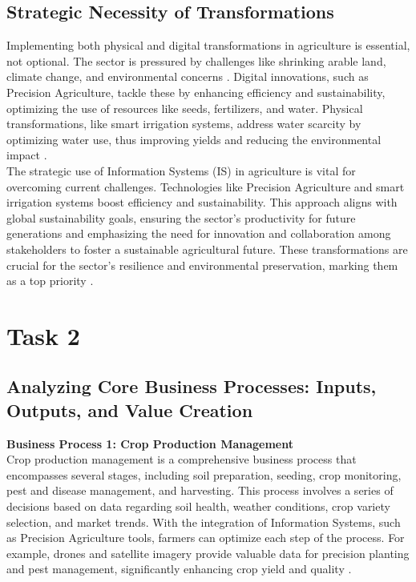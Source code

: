\documentclass[12pt,a4paper]{article}
\begin{document}
\subsection{Strategic Necessity of Transformations}
Implementing both physical and digital transformations in agriculture is essential, not optional. The sector is pressured by challenges like shrinking arable land, climate change, and environmental concerns \citep{Ref_5}. Digital innovations, such as Precision Agriculture, tackle these by enhancing efficiency and sustainability, optimizing the use of resources like seeds, fertilizers, and water. Physical transformations, like smart irrigation systems, address water scarcity by optimizing water use, thus improving yields and reducing the environmental impact \citep{Ref_2}.\\

\noindent The strategic use of Information Systems (IS) in agriculture is vital for overcoming current challenges. Technologies like Precision Agriculture and smart irrigation systems boost efficiency and sustainability. This approach aligns with global sustainability goals, ensuring the sector's productivity for future generations and emphasizing the need for innovation and collaboration among stakeholders to foster a sustainable agricultural future. These transformations are crucial for the sector's resilience and environmental preservation, marking them as a top priority \citep{Ref_9}.\\


\pagebreak



\setcounter{page}{3}

\section{Task 2}
\subsection{Analyzing Core Business Processes: Inputs, Outputs, and Value Creation}
\label{sec:Task 2_A}

\noindent\textbf{Business Process 1: Crop Production Management}\\Crop production management is a comprehensive business process that encompasses several stages, including soil preparation, seeding, crop monitoring, pest and disease management, and harvesting. This process involves a series of decisions based on data regarding soil health, weather conditions, crop variety selection, and market trends. With the integration of Information Systems, such as Precision Agriculture tools, farmers can optimize each step of the process. For example, drones and satellite imagery provide valuable data for precision planting and pest management, significantly enhancing crop yield and quality \citep{Ref_10}.\\
\end{document}
